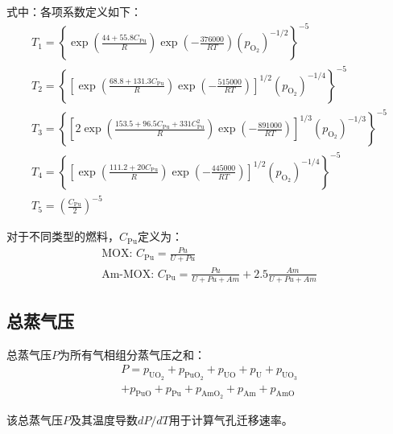 \noindent 式中：各项系数定义如下：
\begin{equation}
	\begin{gathered}
		T_1 = \left\{ \exp\left( \frac{44 + 55.8 C_{\text{Pu}}}{R} \right) \exp\left( -\frac{376000}{RT} \right) (p_{\text{O}_2})^{-1/2} \right\}^{-5} \\
		T_2 = \left\{ \left[ \exp\left( \frac{68.8 + 131.3 C_{\text{Pu}}}{R} \right) \exp\left( -\frac{515000}{RT} \right) \right]^{1/2} (p_{\text{O}_2})^{-1/4} \right\}^{-5} \\
		T_3 = \left\{ \left[ 2 \exp\left( \frac{153.5 + 96.5 C_{\text{Pu}} + 331 C_{\text{Pu}}^2}{R} \right) \exp\left( -\frac{891000}{RT} \right) \right]^{1/3} (p_{\text{O}_2})^{-1/3} \right\}^{-5} \\
		T_4 = \left\{ \left[ \exp\left( \frac{111.2 + 20 C_{\text{Pu}}}{R} \right) \exp\left( -\frac{445000}{RT} \right) \right]^{1/2} (p_{\text{O}_2})^{-1/4} \right\}^{-5} \\
		T_5 = \left( \frac{C_{\text{Pu}}}{2} \right)^{-5}
	\end{gathered}
	\label{eq:app_b_oxygen_pressure_auxiliary_terms}
\end{equation}

对于不同类型的燃料，$C_{\text{Pu}}$定义为：
\begin{equation}
	\begin{gathered}
		\text{MOX: }  C_{\text{Pu}} = \frac{Pu}{U + Pu} \\
		\text{Am-MOX: }  C_{\text{Pu}} = \frac{Pu}{U + Pu + Am} + 2.5 \frac{Am}{U + Pu + Am}
	\end{gathered}
	\label{eq:app_b_plutonium_concentration_definition}
\end{equation}

\subsection{总蒸气压}

总蒸气压$P$为所有气相组分蒸气压之和：
\begin{equation}
	\begin{gathered}
		P = p_{\text{UO}_2}+p_{\text{PuO}_2}+p_{\text{UO}}+p_{\text{U}}+p_{\text{UO}_3} \\
		+p_{\text{PuO}}+p_{\text{Pu}}+p_{\text{AmO}_2}+p_{\text{Am}}+p_{\text{AmO}}
	\end{gathered}
	\label{eq:app_b_total_vapor_pressure}
\end{equation}

该总蒸气压$P$及其温度导数$dP/dT$用于计算气孔迁移速率。


